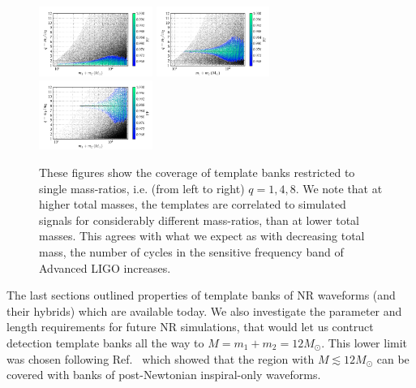 \documentclass[aps,
prd,
twocolumn,
superscriptaddress,
lengthcheck,showpacs,letterpaper,nofootinbib,
floatfix]{revtex4-1}
\begin{document}
\begin{figure}
\begin{center}
\includegraphics[width=0.33\textwidth, trim=17 20 75 40]{bank_separate_q1_mtot200_match-tiny.png}
\includegraphics[width=0.33\textwidth, trim=17 20 75 40]{bank_separate_q4_mtot200_match-tiny.png}
\includegraphics[width=0.33\textwidth, trim=17 20 75 40]{bank_separate_q8_mtot200_match-tiny.png}
\caption{\label{fig:separate_q148} These figures show the coverage of template
  banks restricted to single mass-ratios, i.e. (from left to right) 
  $q = 1, 4, 8$. We note that at 
  higher total masses, the templates are correlated to simulated signals for
  considerably different mass-ratios, than at lower total masses. This agrees
  with what we expect as with decreasing total mass, the number of cycles in
  the sensitive frequency band of Advanced LIGO increases.} 
\end{center}
\end{figure}

The last sections outlined properties of template banks of NR
waveforms (and their hybrids) which are available today. 
We also investigate the parameter and length requirements for future NR 
simulations, that would let us contruct detection template banks all the
way to $M=m_1+m_2=12M_\odot$. This lower limit was chosen following 
Ref.~\cite{Brown:2012nn,CompTemplates2009} which showed that the region with
$M\lesssim 12M_\odot$ can be covered with banks of post-Newtonian inspiral-only
waveforms.
\end{document}
